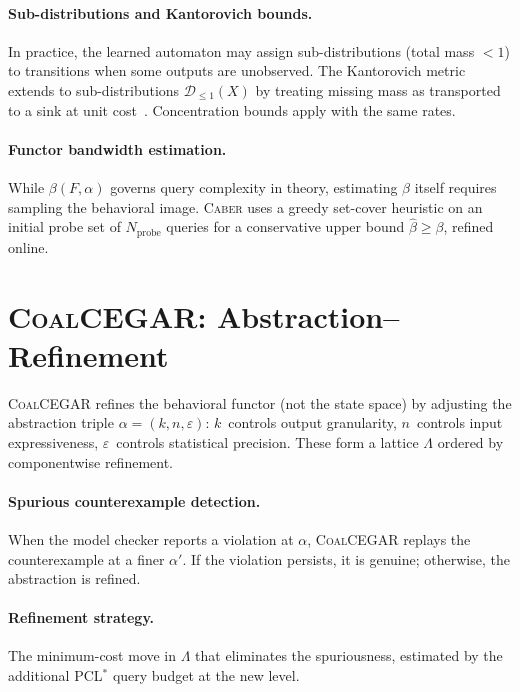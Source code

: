 \documentclass[11pt]{article}
\newcommand{\tool}{\textsc{Caber}}
\newcommand{\pclstar}{PCL$^*$}
\newcommand{\coalcegar}{\textsc{CoalCEGAR}}
\newcommand{\DD}{\mathcal{D}}
\begin{document}
\paragraph{Sub-distributions and Kantorovich bounds.}
In practice, the learned automaton may assign sub-distributions
(total mass $< 1$) to transitions when some outputs are unobserved.
The Kantorovich metric extends to sub-distributions $\DD_{\le 1}(X)$
by treating missing mass as transported to a sink at unit
cost~\cite{baldan2018coalgebraic}.  Concentration bounds apply
with the same rates.

\paragraph{Functor bandwidth estimation.}
While $\beta(F,\alpha)$ governs query complexity in theory, estimating
$\beta$ itself requires sampling the behavioral image.  \tool{} uses
a greedy set-cover heuristic on an initial probe set of
$N_{\mathrm{probe}}$ queries for a conservative upper bound
$\hat{\beta} \ge \beta$, refined online.

\section{\coalcegar{}: Abstraction--Refinement}\label{app:coalcegar}

\coalcegar{} refines the behavioral functor (not the state space) by
adjusting the abstraction triple $\alpha = (k, n, \varepsilon)$:
$k$~controls output granularity, $n$~controls input expressiveness,
$\varepsilon$~controls statistical precision.  These form a lattice
$\Lambda$ ordered by componentwise refinement.

\paragraph{Spurious counterexample detection.}
When the model checker reports a violation at $\alpha$, \coalcegar{}
replays the counterexample at a finer $\alpha'$.  If the violation
persists, it is genuine; otherwise, the abstraction is refined.

\paragraph{Refinement strategy.}
The minimum-cost move in $\Lambda$ that eliminates the spuriousness,
estimated by the additional \pclstar{} query budget at the new level.
\end{document}
